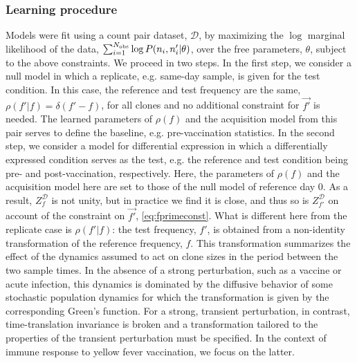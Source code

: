 \documentclass[letterpaper,english,prl,reprint,longbibliography]{revtex4-1} %
\begin{document}

\subsubsection*{Learning procedure}

Models were fit using a count pair dataset, $\mathcal{D}$, by maximizing the $\log$ marginal likelihood of the data, $\sum_{i=1}^{N_{\textrm{\textrm{obs}}}} \log P(n_i,n^{\prime}_i|\theta)$, over the free parameters, $\theta$, subject to the above constraints.
We proceed in two steps.
In the first step, we consider a null model in which a replicate, e.g. same-day sample, is given for the test condition. 
In this case, the reference and test frequency are the same, $\rho(f'|f)=\delta(f'-f)$, for all clones and no additional constraint for $\vec{f'}$ is needed.
The learned parameters of $\rho(f)$ and the acquisition model from this pair serves to define the baseline, e.g. pre-vaccination statistics.
In the second step, we consider a model for differential expression in which a differentially expressed condition serves as the test, e.g. the reference and test condition being pre- and post-vaccination, respectively. 
Here, the parameters of $\rho(f)$ and the acquisition model here are set to those of the null model of reference day 0. 
As a result, $Z^\mathcal{D}_f$ is not unity, but in practice we find it is close, and thus so is $Z^\mathcal{D}_{f'}$ on account of the constraint on $\vec{f'}$, \cref{eq:fprimeconst}.  
What is different here from the replicate case is $\rho(f'|f)$: the test frequency, $f'$, is obtained from a non-identity transformation of the reference frequency, $f$.  
This transformation summarizes the effect of the dynamics assumed to act on clone sizes in the period between the two sample times. 
In the absence of a strong perturbation, such as a vaccine or acute infection, this dynamics is dominated by the diffusive behavior of some stochastic population dynamics for which the transformation is given by the corresponding Green's function.  
For a strong, transient perturbation, in contrast, time-translation invariance is broken and a transformation tailored to the properties of the transient perturbation must be specified. 
In the context of immune response to yellow fever vaccination, we focus on the latter. 
\end{document}

